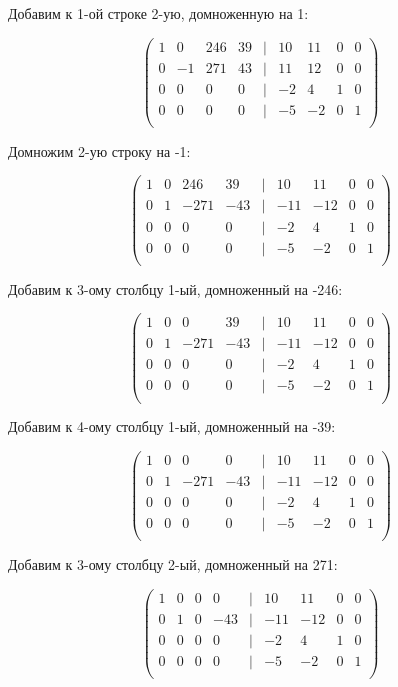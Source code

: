 	Добавим к 1-ой строке 2-ую, домноженную на 1:
	
	\[
	\begin{pmatrix}
	1 & 0 & 246 & 39 & | & 10 & 11 & 0 & 0 \\
	0 & -1 & 271 & 43 & | & 11 & 12 & 0 & 0 \\
	0 & 0 & 0 & 0 & | & -2 & 4 & 1 & 0 \\
	0 & 0 & 0 & 0 & | & -5 & -2 & 0 & 1 \\
	\end{pmatrix}
	\]
	
	Домножим 2-ую строку на -1:
	
	\[
	\begin{pmatrix}
	1 & 0 & 246 & 39 & | & 10 & 11 & 0 & 0 \\
	0 & 1 & -271 & -43 & | & -11 & -12 & 0 & 0 \\
	0 & 0 & 0 & 0 & | & -2 & 4 & 1 & 0 \\
	0 & 0 & 0 & 0 & | & -5 & -2 & 0 & 1 \\
	\end{pmatrix}
	\]
	
	Добавим к 3-ому столбцу 1-ый, домноженный на -246:
	
	\[
	\begin{pmatrix}
	1 & 0 & 0 & 39 & | & 10 & 11 & 0 & 0 \\
	0 & 1 & -271 & -43 & | & -11 & -12 & 0 & 0 \\
	0 & 0 & 0 & 0 & | & -2 & 4 & 1 & 0 \\
	0 & 0 & 0 & 0 & | & -5 & -2 & 0 & 1 \\
	\end{pmatrix}
	\]
	
	Добавим к 4-ому столбцу 1-ый, домноженный на -39:
	
	\[
	\begin{pmatrix}
	1 & 0 & 0 & 0 & | & 10 & 11 & 0 & 0 \\
	0 & 1 & -271 & -43 & | & -11 & -12 & 0 & 0 \\
	0 & 0 & 0 & 0 & | & -2 & 4 & 1 & 0 \\
	0 & 0 & 0 & 0 & | & -5 & -2 & 0 & 1 \\
	\end{pmatrix}
	\]
	
	Добавим к 3-ому столбцу 2-ый, домноженный на 271:
	
	\[
	\begin{pmatrix}
	1 & 0 & 0 & 0 & | & 10 & 11 & 0 & 0 \\
	0 & 1 & 0 & -43 & | & -11 & -12 & 0 & 0 \\
	0 & 0 & 0 & 0 & | & -2 & 4 & 1 & 0 \\
	0 & 0 & 0 & 0 & | & -5 & -2 & 0 & 1 \\
	\end{pmatrix}
	\]
	
